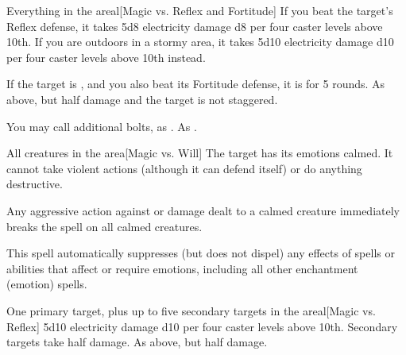 \begin{spelltargets}{Everything in the area}l[Magic vs. Reflex and Fortitude]
    \spellsuccess If you beat the target's Reflex defense, it takes 5d8 electricity damage \add d8 per four caster levels above 10th. If you are outdoors in a stormy area, it takes 5d10 electricity damage \add d10 per four caster levels above 10th instead.

    If the target is \bloodied, and you also beat its Fortitude defense, it is \staggered for 5 rounds.
    \spellfailure As above, but half damage and the target is not staggered.
\end{spelltargets}
\spelleffect You may call additional bolts, as .
\spellnotes As .

\begin{spelltargets}{All creatures in the area}[Magic vs. Will]
    \spellsuccess The target has its emotions calmed. It cannot take violent actions (although it can defend itself) or do anything destructive.
\end{spelltargets}
\spellnotes Any aggressive action against or damage dealt to a calmed creature immediately breaks the spell on all calmed creatures.

This spell automatically suppresses (but does not dispel) any effects of spells or abilities that affect or require emotions, including all other enchantment (emotion) spells.

\spellrng{\rngmed}
\begin{spelltargets}{One primary target, plus up to five secondary targets in the area}l[Magic vs. Reflex]
    \spellsuccess 5d10 electricity damage \add d10 per four caster levels above 10th. Secondary targets take half damage.
    \spellfailure As above, but half damage.
\end{spelltargets}

